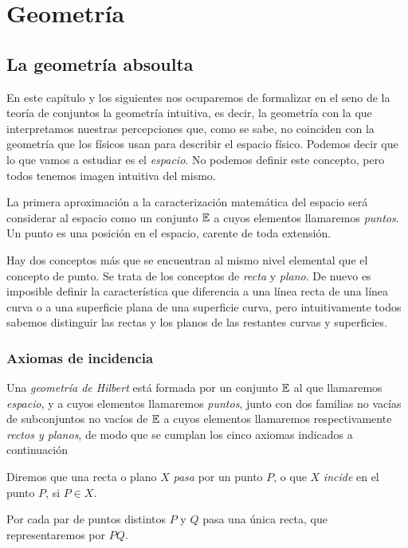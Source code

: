 \chapter{Geometría}
\section{La geometría absoulta}
En este capítulo y los siguientes nos ocuparemos de formalizar en el seno
de la teoría de conjuntos la geometría intuitiva, es decir, la geometría
con la que interpretamos nuestras percepciones que, como se sabe, no
coinciden con la geometría que los físicos usan para describir el espacio
físico. Podemos decir que lo que vamos a estudiar es el \emph{espacio}. No
podemos definir este concepto, pero todos tenemos imagen intuitiva del
mismo.

La primera aproximación a la caracterización matemática del espacio será
considerar al espacio como un conjunto $\mathbb{E}$ a cuyos elementos llamaremos
\emph{puntos}. Un punto es una posición en el espacio, carente de toda
extensión.

Hay dos conceptos más que se encuentran al mismo nivel elemental que el
concepto de punto. Se trata de los conceptos de \emph{recta} y
\emph{plano}. De nuevo es imposible definir la característica que
diferencia a una línea recta de una línea curva o a una superficie plana de
una superficie curva, pero intuitivamente todos sabemos distinguir las
rectas y los planos de las restantes curvas y superficies.
\subsection{Axiomas de incidencia}
\begin{definition}
Una \emph{geometría de Hilbert} está formada por un conjunto $\mathbb{E}$ al que
llamaremos \emph{espacio}, y a cuyos elementos llamaremos \emph{puntos},
junto con dos familias no vacías de subconjuntos no vacíos de $\mathbb{E}$ a
cuyos elementos llamaremos respectivamente \emph{rectos y planos}, de modo
que se cumplan los cinco axiomas indicados a continuación
\end{definition}

Diremos que una recta o plano $X$ \emph{pasa} por un punto $P$, o que $X$
\emph{incide} en el punto $P$, si $P\in X$.

\begin{axioma}
Por cada par de puntos distintos $P$ y $Q$ pasa una única recta, que
representaremos por $PQ$.
\end{axioma}

